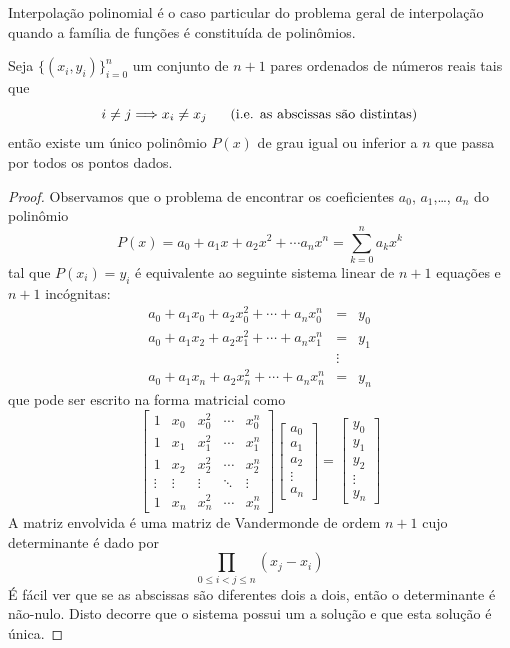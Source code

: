 \documentclass[main.tex]{subfiles}
\begin{document}
Interpolação polinomial é o caso particular do problema geral de interpolação quando a família de funções é constituída de polinômios.
\begin{teo}\label{teo_interp_poli} Seja $\{(x_i,y_i)\}_{i=0}^{n}$ um conjunto de $n+1$ pares ordenados de números reais tais que $$i\neq j \Longrightarrow x_i\neq x_j~~~~\hbox{ (i.e. as abscissas são distintas)}$$
então existe um único polinômio $P(x)$ de grau igual ou inferior a $n$ que passa por todos os pontos dados.
\end{teo}
\begin{proof} Observamos que o problema de encontrar os coeficientes $a_0$, $a_1$,\ldots, $a_n$ do polinômio
$$P(x)=a_0+a_1x+a_2x^2+\cdots a_n x^n=\sum_{k=0}^n a_k x^k$$
tal que $P(x_i)=y_i$ é equivalente ao seguinte sistema linear de $n+1$ equações e $n+1$ incógnitas:
\begin{eqnarray*}
a_0+a_1x_0+a_2x_0^2+\cdots +a_n x_0^n&=&y_0\\
a_0+a_1x_2+a_2x_1^2+\cdots +a_n x_1^n&=&y_1\\
&\vdots&\\
a_0+a_1x_n+a_2x_n^2+\cdots +a_n x_n^n&=&y_n
\end{eqnarray*}
que pode ser escrito na forma matricial como
$$\left[
\begin{array}{ccccc}
1 & x_0 & x_0^2 & \cdots & x_0^n\\
1 & x_1 & x_1^2 & \cdots & x_1^n\\
1 & x_2 & x_2^2 & \cdots & x_2^n\\
\vdots&\vdots&\vdots&\ddots&\vdots\\
1 & x_n & x_n^2 & \cdots & x_n^n
\end{array}
\right]
\left[
\begin{array}{c}
a_0\\a_1\\a_2\\ \vdots \\a_n
\end{array}
\right]=
\left[
\begin{array}{c}
y_0\\y_1\\y_2\\ \vdots \\y_n
\end{array}
\right]
$$
A matriz envolvida é uma matriz de Vandermonde de ordem $n+1$ cujo determinante é dado por
$$\prod_{0\leq i<j\leq n}\left(x_j-x_i\right)$$
É fácil ver que se as abscissas são diferentes dois a dois, então o determinante é não-nulo. Disto decorre que o sistema possui um a solução e que esta solução é única.
\end{proof}
\end{document}

